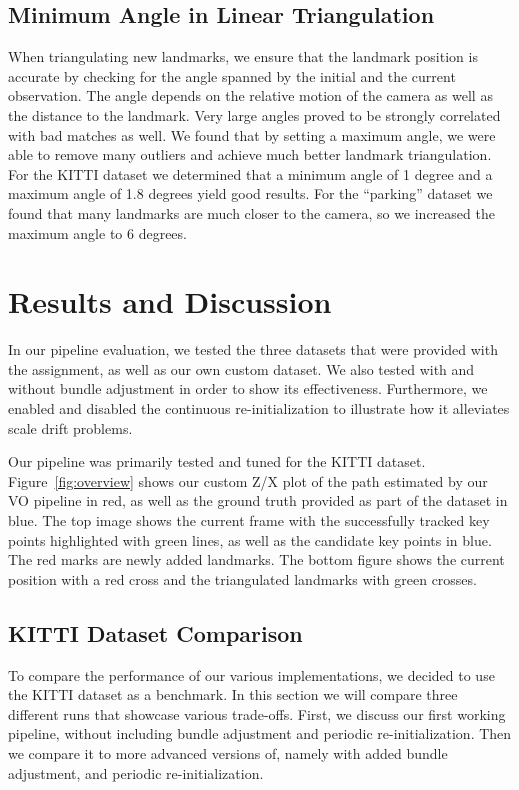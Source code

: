 \documentclass[11pt]{article}
\begin{document}
\subsection{Minimum Angle in Linear Triangulation}
When triangulating new landmarks, we ensure that the landmark position is accurate by checking for the angle spanned by the initial and the current observation. The angle depends on the relative motion of the camera as well as the distance to the landmark.
Very large angles proved to be strongly correlated with bad matches as well. We found that by setting a maximum angle, we were able to remove many outliers and achieve much better landmark triangulation. 
For the KITTI dataset we determined that a minimum angle of 1 degree and a maximum angle of 1.8 degrees yield good results. For the “parking” dataset we found that many landmarks are much closer to the camera, so we increased the maximum angle to 6 degrees.

\section{Results and Discussion}
In our pipeline evaluation, we tested the three datasets that were provided with the assignment, as well as our own custom dataset. We also tested with and without bundle adjustment in order to show its effectiveness. Furthermore, we enabled and disabled the continuous re-initialization to illustrate how it alleviates scale drift problems.

Our pipeline was primarily tested and tuned for the KITTI dataset. Figure~\ref{fig:overview} shows our custom Z/X plot of the path estimated by our VO pipeline in red, as well as the ground truth provided as part of the dataset in blue. The top image shows the current frame with the successfully tracked key points highlighted with green lines, as well as the candidate key points in blue. The red marks are newly added landmarks. The bottom figure shows the current position with a red cross and the triangulated landmarks with green crosses.

\subsection{KITTI Dataset Comparison}
To compare the performance of our various implementations, we decided to use the KITTI dataset as a benchmark. In this section we will compare three different runs that showcase various trade-offs. First, we discuss our first working pipeline, without including bundle adjustment and periodic re-initialization. Then we compare it to more advanced versions of, namely with added bundle adjustment, and periodic re-initialization.
\end{document}
